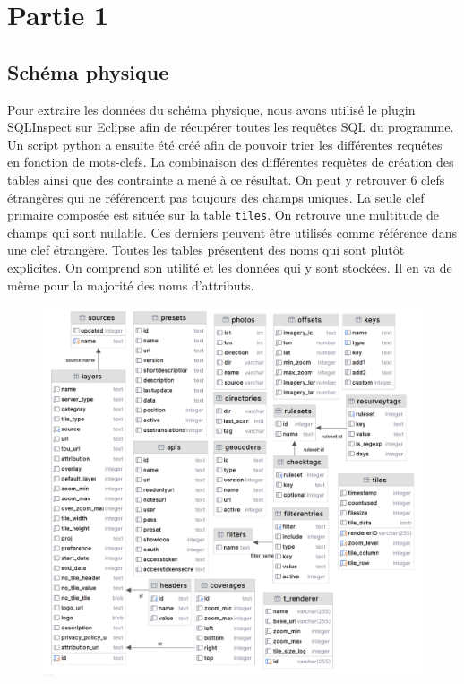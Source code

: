 \section{Partie 1}
\subsection{Schéma physique}
Pour extraire les données du schéma physique, nous avons utilisé le plugin SQLInspect sur Eclipse afin de récupérer toutes les requêtes SQL du programme. Un script python a ensuite été créé afin de pouvoir trier les différentes requêtes en fonction de mots-clefs. La combinaison des différentes requêtes de création des tables ainsi que des contrainte a mené à ce résultat. On peut y retrouver 6 clefs étrangères qui ne référencent pas toujours des champs uniques. La seule clef primaire composée est située sur la table \texttt{tiles}. On retrouve une multitude de champs qui sont nullable. Ces derniers peuvent être utilisés comme référence dans une clef étrangère.
Toutes les tables présentent des noms qui sont plutôt explicites. On comprend son utilité et les données qui y sont stockées. Il en va de même pour la majorité des noms d'attributs.
\begin{figure}[!ht]
    \centering
    \includegraphics[scale=1]{images/schema_physique.png}
    \label{fig:schéma physique}
\end{figure}

